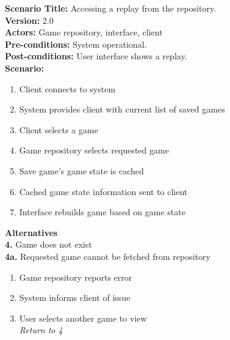 \documentclass[letterpaper,12pt]{article}
\begin{document}
\noindent \textbf{Scenario Title:} Accessing a replay from the repository.\\
\textbf{Version:} 2.0\\
\textbf{Actors:} Game repository, interface, client\\
\textbf{Pre-conditions:} System operational.\\
\textbf{Post-conditions:} User interface shows a replay.\\
\textbf{Scenario:}
\begin{enumerate}
\item Client connects to system
\item System provides client with current list of saved games
\item Client selects a game
\item Game repository selects requested game 
\item Save game's game state is cached
\item Cached game state information sent to client
\item Interface rebuilds game based on game state
\end{enumerate}
\textbf{Alternatives}\\
\textbf{4.} Game does not exist \\
\textbf{4a.} Requested game cannot be fetched from repository
\begin {enumerate}
\item Game repository reports error
\item System informs client of issue
\item User selects another game to view \\
\emph {Return to 4}
\end{enumerate}
\end{document}
